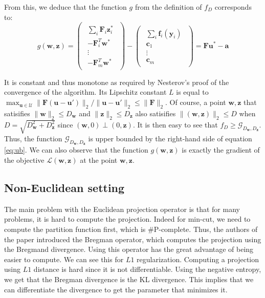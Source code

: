 \documentclass{article}
\renewcommand{\vec}{\mathbf}
\begin{document}
From this, we deduce that the function $g$ from the definition of $f_D$ corresponds to:
\begin{equation}
  g(\vec w, \vec z) =
  \begin{pmatrix}
    \begin{array}{c}
      \sum_i \vec F_i \vec z_i^*\\
      - \vec F_i^T \vec w^*\\
      \vdots\\
      - \vec F_m^T \vec w^*
    \end{array}
  \end{pmatrix} -
  \begin{pmatrix}
    \begin{array}{c}
      \sum_i \vec f_i (\vec y_i)\\
      \vec c_1\\
      \vdots\\
      \vec c_m
    \end{array}
  \end{pmatrix} = \vec F \vec u^* - \vec a
\end{equation}


It is constant and thus monotone as required by Nesterov's proof of the convergence of the algorithm. Its Lipschitz constant $L$ is equal to $\max_{\vec u \in \mathcal{U}} \lVert \vec F (\vec u - \vec u') \rVert_2 / \lVert \vec u - \vec u' \rVert_2 \leq \lVert \vec F \rVert_2$. Of course, a point $\vec w, \vec z$ that satisifies $\lVert \vec w \rVert_2 \leq D_{\vec w}$ and $\lVert \vec z \rVert_2 \leq D_{\vec z}$ also satisifies $\lVert (\vec w, \vec z) \rVert_2 \leq D$ when $D = \sqrt{D_{\vec w}^2 + D_{\vec z}^2}$ since $(\vec w, 0) \perp (0, \vec z)$. It is then easy to see that $f_D \geq \mathcal{G}_{D_{\vec w}, D_{\vec z}}$. Thus, the function $\mathcal{G}_{D_{\vec w}, D_{\vec z}}$ is upper bounded by the right-hand side of equation \ref{eq:ub}. We can also observe that the function $g(\vec w, \vec z)$ is exactly the gradient of the objective $\mathcal{L}(\vec w, \vec z)$ at the point $\vec w, \vec z$.


\subsection{Non-Euclidean setting}
The main problem with the Euclidean projection operator is that for many
problems, it is hard to compute the projection. Indeed for min-cut, we need to
compute the partition function first, which is \#P-complete. Thus, the authors
of the paper introduced the Bregman operator, which computes the projection
using the Bregmand divergence. Using this operator has the great advantage of
being easier to compute. We can see this for $L1$ regularization. Computing a
projection using $L1$ distance is hard since it is not differentiable. Using the
negative entropy, we get that the Bregman divergence is the KL divergence. This
implies that we can differentiate the divergence to get the parameter that
minimizes it.
\end{document}
